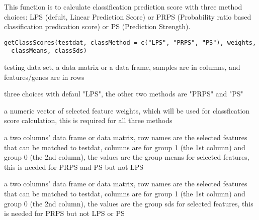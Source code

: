 \documentclass[letterpaper]{book}
\begin{document}
%
\begin{Description}\relax
This function is to calculate classification prediction score with three method choices: 
LPS (defult, Linear Prediction Score) or PRPS (Probability ratio based classification predication score) or PS (Prediction Strength).
\end{Description}
%
\begin{Usage}
\begin{verbatim}
getClassScores(testdat, classMethod = c("LPS", "PRPS", "PS"), weights,
  classMeans, classSds)
\end{verbatim}
\end{Usage}
%
\begin{Arguments}
\begin{ldescription}
\item[\code{testdat}] testing data set, a data matrix or a data frame, samples are in columns, and features/genes are in rows

\item[\code{classMethod}] three choices with defaul "LPS", the other two methods are "PRPS" and "PS"

\item[\code{weights}] a numeric vector of selected feature weights, which will be used for classfication score calculation,
this is required for all three methods

\item[\code{classMeans}] a two columns' data frame or data matrix, row names are the selected features that can be matched to testdat, 
columns are for group 1 (the 1st column) and group 0 (the 2nd column), the values are the group means for selected features, 
this is needed for PRPS and PS but not LPS

\item[\code{classSds}] a two columns' data frame or data matrix, row names are the selected features that can be matched to testdat, 
columns are for group 1 (the 1st column) and group 0 (the 2nd column), the values are the group sds for selected features, 
this is needed for PRPS but not LPS or PS
\end{ldescription}
\end{Arguments}
%
\end{document}
